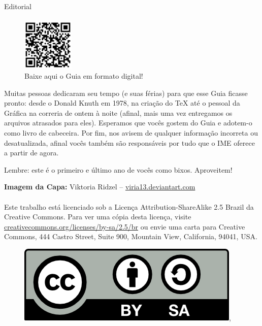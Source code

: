 \begin{editorial}{Editorial}
\paragraph{}
\begin{figure}
  \vspace{-30pt}
  \begin{center}
    \includegraphics[width=0.22\textwidth]{img/qrcode.pdf}
  \end{center}
  \vspace{-20pt}
  \caption{Baixe aqui o Guia em formato digital!}
  \vspace{-30pt}
\end{figure}
Muitas pessoas dedicaram seu tempo (e suas férias) para que esse Guia ficasse pronto: desde o
Donald Knuth em 1978, na criação do \TeX\makebox{} até o pessoal da Gráfica na correria de
ontem à noite (afinal, mais uma vez entregamos os arquivos atrasados para eles).
Esperamos que vocês gostem do Guia e adotem-o como livro de cabeceira. Por fim,
nos avisem de qualquer informação incorreta ou desatualizada, afinal vocês também são
responsáveis por tudo que o IME oferece a partir de agora.

Lembre: este é o primeiro e último ano de vocês como bixos. Aproveitem!

{\bf Imagem da Capa:} Viktoria Ridzel -- \href{www.viria13.deviantart.com}{viria13.deviantart.com}


\paragraph{}
Este trabalho está licenciado sob a Licença Attribution-ShareAlike 2.5 Brazil
da Creative Commons. Para ver uma cópia desta licença,
visite \url{creativecommons.org/licenses/by-sa/2.5/br} ou envie uma
carta para Creative Commons, 444 Castro Street, Suite 900, Mountain View,
California, 94041, USA.
\\
\begin{figure}[H]
    \centering
    \includegraphics{img/cc/by-sa.png},
\end{figure}

\thispagestyle{empty}
\pagebreak
\end{editorial}

